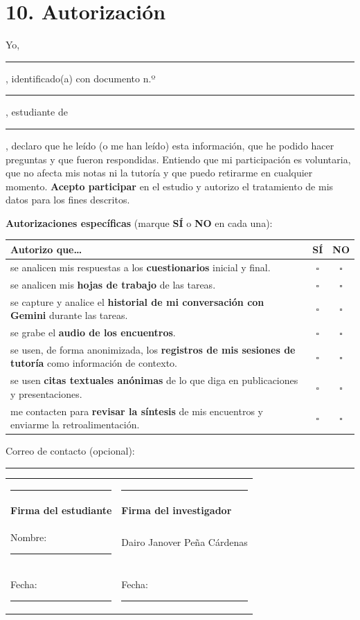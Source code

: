 \documentclass[11pt,letterpaper]{article}
\newcommand{\Investigador}{Dairo Janover Peña Cárdenas}
\newcommand{\linea}[1][6cm]{\rule{#1}{0.4pt}}
\begin{document}
\newpage
\section*{10. Autorización}

\noindent Yo, \linea[6.5cm], identificado(a) con documento n.º \linea[3.5cm], estudiante de \linea[5.5cm], declaro que he leído (o me han leído) esta información, que he podido hacer preguntas y que fueron respondidas. Entiendo que mi participación es voluntaria, que no afecta mis notas ni la tutoría y que puedo retirarme en cualquier momento. \textbf{Acepto participar} en el estudio y autorizo el tratamiento de mis datos para los fines descritos.

\medskip
\noindent\textbf{Autorizaciones específicas} (marque \textbf{SÍ} o \textbf{NO} en cada una):

\begin{center}
\small
\renewcommand{\arraystretch}{1.2}
\begin{tabularx}{\linewidth}{@{}Lcc@{}}
\toprule
\textbf{Autorizo que\ldots} & \textbf{SÍ} & \textbf{NO}\\
\midrule
se analicen mis respuestas a los \textbf{cuestionarios} inicial y final. & $\square$ & $\square$\\
se analicen mis \textbf{hojas de trabajo} de las tareas. & $\square$ & $\square$\\
se capture y analice el \textbf{historial de mi conversación con Gemini} durante las tareas. & $\square$ & $\square$\\
se grabe el \textbf{audio de los encuentros}. & $\square$ & $\square$\\
se usen, de forma anonimizada, los \textbf{registros de mis sesiones de tutoría} como información de contexto. & $\square$ & $\square$\\
se usen \textbf{citas textuales anónimas} de lo que diga en publicaciones y presentaciones. & $\square$ & $\square$\\
me contacten para \textbf{revisar la síntesis} de mis encuentros y enviarme la retroalimentación. & $\square$ & $\square$\\
\bottomrule
\end{tabularx}
\end{center}

\noindent Correo de contacto (opcional): \linea[7cm]

\vspace{0.6cm}
\noindent
\begin{tabularx}{\linewidth}{@{}XX@{}}
\linea[7cm] & \linea[7cm]\\
\textbf{Firma del estudiante} & \textbf{Firma del investigador}\\
Nombre: \linea[5.3cm] & \Investigador\\
Fecha: \linea[5.5cm] & Fecha: \linea[5.5cm]\\
\end{tabularx}
\end{document}
